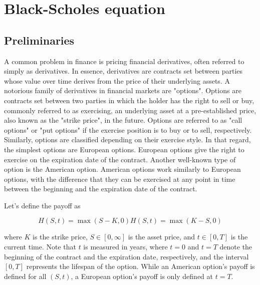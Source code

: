 
\section{Black-Scholes equation} \label{sec:blackscholes}

\subsection{Preliminaries}

A common problem in finance is pricing financial derivatives, often referred to 
simply as derivatives. In essence, derivatives are contracts set between parties 
whose value over time derives from the price of their underlying assets. A 
notorious family of derivatives in financial markets are "options". Options are 
contracts set between two parties in which the holder has the right to sell or 
buy, commonly referred to as exercising, an underlying asset at a 
pre-established price, also known as the "strike price", in the future. Options 
are referred to as "call options" or "put options" if the exercise position is 
to buy or to sell, respectively. Similarly, options are classified depending on 
their exercise style. In that regard, the simplest options are European options. 
European options give the right to exercise on the expiration date of the contract. 
Another well-known type of option is the American option. American options work 
similarly to European options, with the difference that they can be exercised at
any point in time between the beginning and the expiration date of the contract.

Let's define the payoff as

\begin{subequations} \label{eq:blackscholes:preliminaries:payoff_function}
\begin{equation}
H(S, t) = \max(S - K, 0)
\end{equation}
\begin{equation}
H(S, t) = \max(K - S, 0)
\end{equation}
\end{subequations}

where $K$ is the strike price, $S \in [0, \infty]$ is the asset price, and
$t \in [0, T]$ is the current time. Note that $t$ is measured in years, where 
$t=0$ and $t=T$ denote the beginning of the contract and the expiration date, 
respectively, and the interval $[0, T]$ represents the lifespan of the option. 
While an American option's payoff is defined for all $(S, t)$, a European 
option's payoff is only defined at $t=T$.

